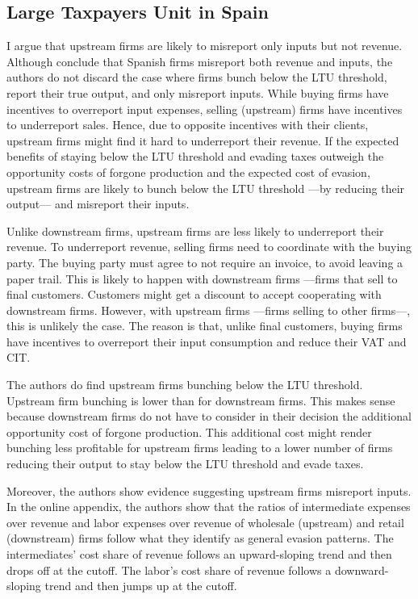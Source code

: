 \documentclass[
  12pt]{article}
\theoremstyle{definition}
\theoremstyle{remark}
\begin{document}
\subsection{Large Taxpayers Unit in
Spain}\label{large-taxpayers-unit-in-spain}

I argue that upstream firms are likely to misreport only inputs but not
revenue. Although \citet{Almunia2018} conclude that Spanish firms
misreport both revenue and inputs, the authors do not discard the case
where firms bunch below the LTU threshold, report their true output, and
only misreport inputs. While buying firms have incentives to overreport
input expenses, selling (upstream) firms have incentives to underreport
sales. Hence, due to opposite incentives with their clients, upstream
firms might find it hard to underreport their revenue. If the expected
benefits of staying below the LTU threshold and evading taxes outweigh
the opportunity costs of forgone production and the expected cost of
evasion, upstream firms are likely to bunch below the LTU threshold
---by reducing their output--- and misreport their inputs.

Unlike downstream firms, upstream firms are less likely to underreport
their revenue. To underreport revenue, selling firms need to coordinate
with the buying party. The buying party must agree to not require an
invoice, to avoid leaving a paper trail. This is likely to happen with
downstream firms ---firms that sell to final customers. Customers might
get a discount to accept cooperating with downstream firms. However,
with upstream firms ---firms selling to other firms---, this is unlikely
the case. The reason is that, unlike final customers, buying firms have
incentives to overreport their input consumption and reduce their VAT
and CIT.

The authors do find upstream firms bunching below the LTU threshold.
Upstream firm bunching is lower than for downstream firms. This makes
sense because downstream firms do not have to consider in their decision
the additional opportunity cost of forgone production. This additional
cost might render bunching less profitable for upstream firms leading to
a lower number of firms reducing their output to stay below the LTU
threshold and evade taxes.

Moreover, the authors show evidence suggesting upstream firms misreport
inputs. In the online appendix, the authors show that the ratios of
intermediate expenses over revenue and labor expenses over revenue of
wholesale (upstream) and retail (downstream) firms follow what they
identify as general evasion patterns. The intermediates' cost share of
revenue follows an upward-sloping trend and then drops off at the
cutoff. The labor's cost share of revenue follows a downward-sloping
trend and then jumps up at the cutoff.
\end{document}
